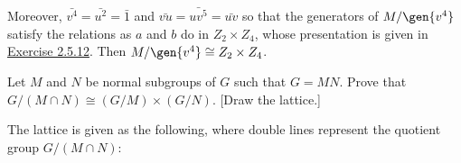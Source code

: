 \begin{problems}
\begin{sol}
\begin{center}
        \end{center}
        Moreover, $\bar{v^4} = \bar{u^2} = \bar 1$ and $\bar{vu} = \bar{uv^5} = \bar{uv}$ so that the generators of $M/\gen{v^4}$ satisfy the relations as $a$ and $b$ do in $Z_2 \times Z_4$, whose presentation is given in \hyperref[ex2.5.12]{Exercise 2.5.12}. Then $M/\gen{v^4} \cong Z_2 \times Z_4$.
    \end{sol}
    \item Let $M$ and $N$ be normal subgroups of $G$ such that $G = MN$. Prove that $G/(M \cap N) \cong (G/M) \times (G/N)$. [Draw the lattice.]
    \begin{sol}
        The lattice is given as the following, where double lines represent the quotient group $G/(M \cap N)$:
        \begin{center}
\end{center}
\end{sol}
\end{problems}
